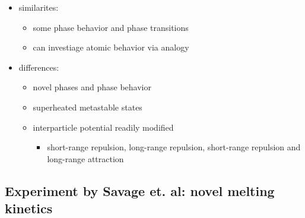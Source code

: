 \documentclass{umthesis}          %
\begin{document}
\begin{itemize}

\item similarites:\\
\label{sec-3.1.1.1}

\begin{itemize}

\item some phase behavior and phase transitions\\
\label{sec-3.1.1.1.1}


\item can investiage atomic behavior via analogy\\
\label{sec-3.1.1.1.2}

\end{itemize} %

\item differences:\\
\label{sec-3.1.1.2}

\begin{itemize}

\item novel phases and phase behavior\\
\label{sec-3.1.1.2.1}


\item superheated metastable states\\
\label{sec-3.1.1.2.2}


\item interparticle potential readily modified\\
\label{sec-3.1.1.2.3}

\begin{itemize}

\item short-range repulsion, long-range repulsion, short-range repulsion and long-range attraction\\
\label{sec-3.1.1.2.3.1}

\end{itemize} %
\end{itemize} %
\end{itemize} %
\subsection{Experiment by Savage et. al: novel melting kinetics}
\label{sec-3.1.2}
\end{document}
